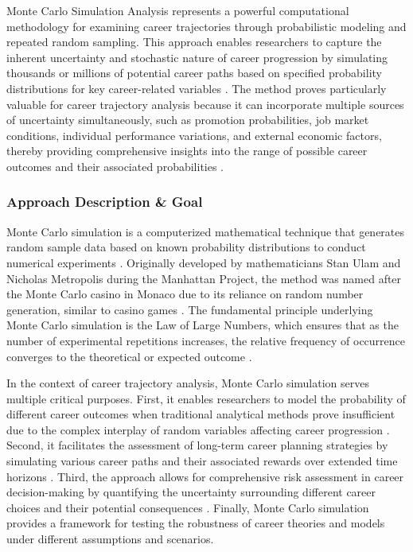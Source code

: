 \documentclass[main.tex]{subfiles}
\begin{document}
Monte Carlo Simulation Analysis represents a powerful computational methodology for examining career trajectories through probabilistic modeling and repeated random sampling. This approach enables researchers to capture the inherent uncertainty and stochastic nature of career progression by simulating thousands or millions of potential career paths based on specified probability distributions for key career-related variables \parencite{investopedia2024,poldrack2022}. The method proves particularly valuable for career trajectory analysis because it can incorporate multiple sources of uncertainty simultaneously, such as promotion probabilities, job market conditions, individual performance variations, and external economic factors, thereby providing comprehensive insights into the range of possible career outcomes and their associated probabilities \parencite{sciencedirect2024,guo2022nature}.

\subsubsection{Approach Description \& Goal}

Monte Carlo simulation is a computerized mathematical technique that generates random sample data based on known probability distributions to conduct numerical experiments \parencite{usp2024}. Originally developed by mathematicians Stan Ulam and Nicholas Metropolis during the Manhattan Project, the method was named after the Monte Carlo casino in Monaco due to its reliance on random number generation, similar to casino games \parencite{poldrack2022}. The fundamental principle underlying Monte Carlo simulation is the Law of Large Numbers, which ensures that as the number of experimental repetitions increases, the relative frequency of occurrence converges to the theoretical or expected outcome \parencite{usp2024}.

In the context of career trajectory analysis, Monte Carlo simulation serves multiple critical purposes. First, it enables researchers to model the probability of different career outcomes when traditional analytical methods prove insufficient due to the complex interplay of random variables affecting career progression \parencite{investopedia2024}. Second, it facilitates the assessment of long-term career planning strategies by simulating various career paths and their associated rewards over extended time horizons \parencite{guo2022nature}. Third, the approach allows for comprehensive risk assessment in career decision-making by quantifying the uncertainty surrounding different career choices and their potential consequences \parencite{sciencedirect2024}. Finally, Monte Carlo simulation provides a framework for testing the robustness of career theories and models under different assumptions and scenarios.
\end{document}
